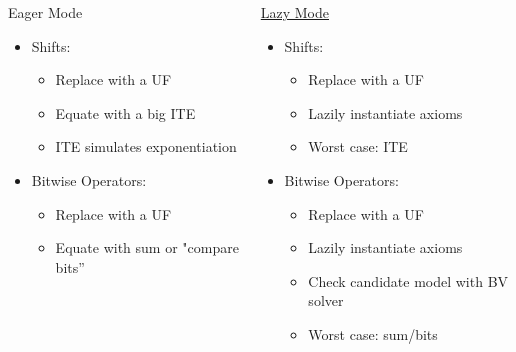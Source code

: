 \documentclass[t,aspectratio=43,9pt,bookmarks=false,dvipsnames,table]{beamer}
\begin{document}
\begin{frame}[t]
  \begin{block}{}
  \begin{columns}
  \begin{alertblock}{Eager Mode}
      \begin{itemize}
      \item Shifts:
        \begin{itemize}
          \item Replace with a UF
          \item Equate with a big ITE
          \item ITE simulates exponentiation
        \end{itemize}
      \item Bitwise Operators:
        \begin{itemize}
            \item Replace with a UF
            \item Equate with sum or "compare bits''
         \end{itemize}
      \end{itemize}
  \end{alertblock}
  \begin{alertblock}{\underline{Lazy Mode}}
    \begin{itemize}
      \item Shifts:
        \begin{itemize}
          \item Replace with a UF
          \item Lazily instantiate axioms
          \item Worst case: ITE
        \end{itemize}
      \item Bitwise Operators:
        \begin{itemize}
        \item Replace with a UF
        \item Lazily instantiate axioms
        \item Check candidate model with BV solver
        \item Worst case: sum/bits
        \end{itemize}
                \end{itemize}
  \end{alertblock}
  \end{columns}
\end{block}
\end{frame}
\end{document}
